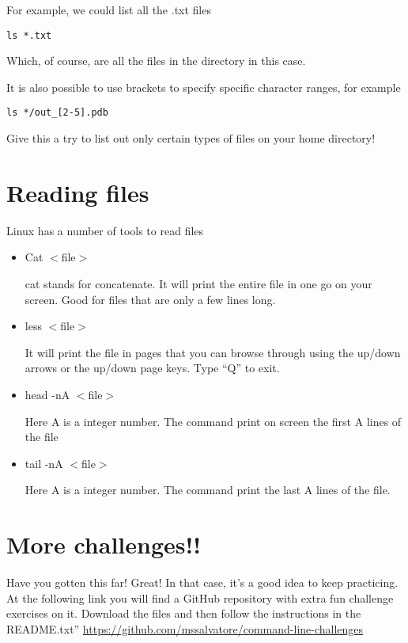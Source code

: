\documentclass[aps,showpacs,prd,notitlepage,preprintnumbers,amsmath,amssymb,letterpaper]{revtex4}
\begin{document}
For example, we could list all the .txt files
\begin{verbatim}
ls *.txt
\end{verbatim}
Which, of course, are all the files in the directory in this case.

It is also possible to use brackets to specify specific character ranges, for example
\begin{verbatim}
ls */out_[2-5].pdb
\end{verbatim}

Give this a try to list out only certain types of files on your home directory!

\section{Reading files}

Linux has a number of tools to read files

\begin{itemize}

\item Cat $<$file$>$

  cat stands for concatenate. It will print the entire file in one go on your screen. Good for files
  that are only a few lines long.

\item less $<$file$>$

  It will print the file in pages that you can browse through using the up/down arrows or the up/down
  page keys. Type ``Q'' to exit.

\item head -nA $<$file$>$

  Here A is a integer number. The command print on screen the first A lines of the file

\item tail -nA $<$file$>$

Here A is a integer number. The command print the last A lines of the file.

\end{itemize}

\section{More challenges!!}
Have you gotten this far! Great! In that case, it's a good idea to keep practicing.
At the following link you will find a GitHub repository with extra fun challenge exercises on it. Download the files and then follow the instructions in the README.txt''
\url{https://github.com/mssalvatore/command-line-challenges}
\end{document}
